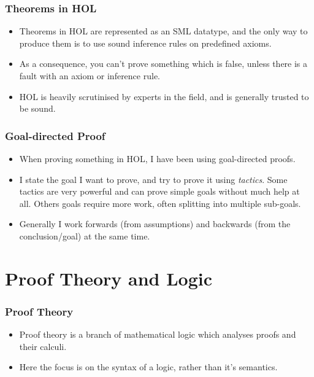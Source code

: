 \documentclass[english,svgnames,hide notes,12pt]{beamer}
\theoremstyle{definition}
\theoremstyle{remark}
\begin{document}
\begin{frame}
    \frametitle{Theorems in HOL}
    \begin{itemize}
        \item Theorems in HOL are represented as an SML datatype, and the only way to produce them is to use sound inference rules on predefined axioms.
        \item As a consequence, you can't prove something which is false, unless there is a fault with an axiom or inference rule.
        \item HOL is heavily scrutinised by experts in the field, and is generally trusted to be sound.
    \end{itemize}
\end{frame}

\begin{frame}
	\frametitle{Goal-directed Proof}
    \begin{itemize}
        \item When proving something in HOL, I have been using goal-directed proofs.
        \item I state the goal I want to prove, and try to prove it using \emph{tactics}. Some tactics are very powerful and can prove simple goals without much help at all. Others goals require more work, often splitting into multiple sub-goals. 
        \item Generally I work forwards (from assumptions) and backwards (from the conclusion/goal) at the same time.
    \end{itemize}
\end{frame}

\section{Proof Theory and Logic}

\begin{frame}
    \frametitle{Proof Theory}
    \begin{itemize}
        \item Proof theory is a branch of mathematical logic which analyses proofs and their calculi. 
        \item Here the focus is on the syntax of a logic, rather than it's semantics.
    \end{itemize}
\end{frame}
\end{document}
